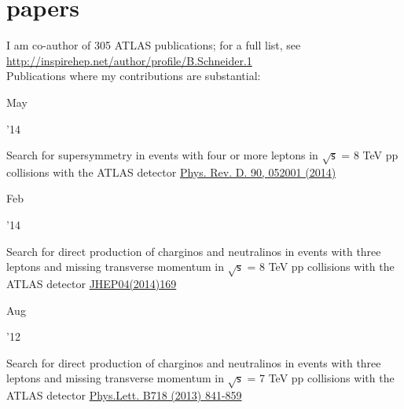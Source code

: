 \documentclass[]{cv} %
\begin{document}
\newpage

\section{papers}
\begin{entrylist}

  \entry
  {}
  {I am co-author of 305 ATLAS publications; for a full list, see \\
    \href{http://inspirehep.net/author/profile/B.Schneider.1}{http://inspirehep.net/author/profile/B.Schneider.1}\\
  Publications where my contributions are substantial:}
  {}
  {\vspace*{\spacingPubs}}

  \entry
  {\parbox[t]{\parboxWidthOne}{May}\parbox[t]{\parboxWidthTwo}{\hfill '14}}
  {Search for supersymmetry in events with four or more leptons in $\sqrt{\mathsf{s}}$ = 8 TeV pp collisions with the ATLAS detector}
  {\href{http://link.aps.org/doi/10.1103/PhysRevD.90.052001}{Phys. Rev. D. 90, 052001 (2014)}}
  {\vspace*{\spacingPubs}}

  \entry
  {\parbox[t]{\parboxWidthOne}{Feb}\parbox[t]{\parboxWidthTwo}{\hfill '14}}
  {Search for direct production of charginos and neutralinos in events with three leptons and missing transverse momentum in $\sqrt{\mathsf{s}}$ =
8 TeV pp collisions with the ATLAS detector}
{\href{http://dx.doi.org/10.1007/JHEP04(2014)169}{JHEP04(2014)169}}
{\vspace*{\spacingPubs}}

    \entry
    {\parbox[t]{\parboxWidthOne}{Aug}\parbox[t]{\parboxWidthTwo}{\hfill '12}}
    {Search for direct production of charginos and neutralinos in events with three leptons and missing transverse momentum in $\sqrt{\mathsf{s}}$ =
  7 TeV pp collisions with the ATLAS detector}
  {\href{http://dx.doi.org/10.1016/j.physletb.2012.11.039}{Phys.Lett. B718 (2013) 841-859}}
  {\vspace*{\spacingPubs}}

\end{entrylist}
\end{document}
